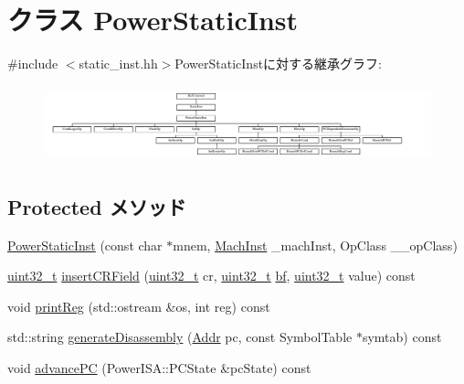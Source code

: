 \hypertarget{classPowerISA_1_1PowerStaticInst}{
\section{クラス PowerStaticInst}
\label{classPowerISA_1_1PowerStaticInst}
}


{\ttfamily \#include $<$static\_\-inst.hh$>$}PowerStaticInstに対する継承グラフ:\begin{figure}[H]
\begin{center}
\leavevmode
\includegraphics[height=2.22222cm]{classPowerISA_1_1PowerStaticInst}
\end{center}
\end{figure}
\subsection*{Protected メソッド}
\begin{DoxyCompactItemize}
\item 
\hyperlink{classPowerISA_1_1PowerStaticInst_a8b36d6713ea77a6426770333f53ba52e}{PowerStaticInst} (const char $\ast$mnem, \hyperlink{namespacePowerISA_a301c22ea09fa33dcfe6ddf22f203699c}{MachInst} \_\-machInst, OpClass \_\-\_\-opClass)
\item 
\hyperlink{Type_8hh_a435d1572bf3f880d55459d9805097f62}{uint32\_\-t} \hyperlink{classPowerISA_1_1PowerStaticInst_a37e5ceb738a441d40cfc5ec91bb7c016}{insertCRField} (\hyperlink{Type_8hh_a435d1572bf3f880d55459d9805097f62}{uint32\_\-t} cr, \hyperlink{Type_8hh_a435d1572bf3f880d55459d9805097f62}{uint32\_\-t} \hyperlink{namespacePowerISA_ae5bcb1e163a6022898529ca80fc745ef}{bf}, \hyperlink{Type_8hh_a435d1572bf3f880d55459d9805097f62}{uint32\_\-t} value) const 
\item 
void \hyperlink{classPowerISA_1_1PowerStaticInst_a48f52fc281b71e29aa8733caf36546fa}{printReg} (std::ostream \&os, int reg) const 
\item 
std::string \hyperlink{classPowerISA_1_1PowerStaticInst_a95d323a22a5f07e14d6b4c9385a91896}{generateDisassembly} (\hyperlink{base_2types_8hh_af1bb03d6a4ee096394a6749f0a169232}{Addr} pc, const SymbolTable $\ast$symtab) const 
\item 
void \hyperlink{classPowerISA_1_1PowerStaticInst_af4df5e33fa362c547928975229de8350}{advancePC} (PowerISA::PCState \&pcState) const 
\end{DoxyCompactItemize}


